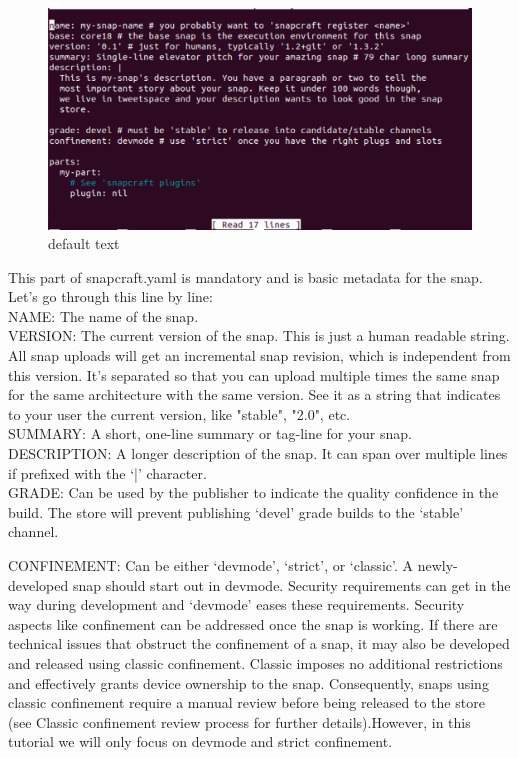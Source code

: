 \documentclass{article}
\begin{document}
\begin{flushleft}
	\begin{figure}[H]

	\includegraphics[width=5in]{step17.png}
	\caption[Optional caption]{default text}
	\label{fig:step17}
	\end{figure}
	
\begin{flushleft}	
This part of snapcraft.yaml is mandatory and is basic metadata for the snap.
Let's go through this line by line:\\
[5mm]
NAME: The name of the snap.\\
[5mm]
VERSION: The current version of the snap. This is just a human readable string. All snap
uploads will get an incremental snap revision, which is independent from this version. It's
separated so that you can upload multiple times the same snap for the same architecture with
the same version. See it as a string that indicates to your user the current version, like
"stable", "2.0", etc.\\
[5mm]
SUMMARY: A short, one-line summary or tag-line for your snap.\\
[5mm]
DESCRIPTION: A longer description of the snap. It can span over multiple lines if prefixed
with the ‘|' character.\\
[5 mm]

GRADE: Can be used by the publisher to indicate the quality confidence in the build. The
store will prevent publishing ‘devel' grade builds to the ‘stable' channel.\\
\cleardoublepage

CONFINEMENT: Can be either ‘devmode', ‘strict', or ‘classic'. A newly-developed snap should start out
in devmode. Security requirements can get in the way during development and ‘devmode' eases
these requirements. Security aspects like confinement can be addressed once the snap is
working. If there are technical issues that obstruct the confinement of a snap, it may also be developed and released using classic confinement. Classic imposes no additional restrictions and effectively grants device ownership to the snap. Consequently, snaps using classic confinement require a manual review before being released to the store (see Classic confinement review process for further details).However, in this tutorial we will only focus on devmode and strict confinement.
\end{flushleft}	
\cleardoublepage
%
%
%
%

\end{flushleft}
\end{document}
